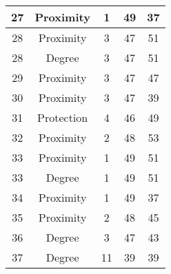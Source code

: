 \documentclass[results.tex]{subfiles}
\begin{document}
\begin{center}
\begin{tabular}{| c || c | c | c | c |}
            \hline
            27                      & Proximity                    & 1                      & 49                      & 37                   \\
            \hline
            28                      & Proximity                    & 3                      & 47                      & 51                   \\
            \hline
            28                      & Degree                       & 3                      & 47                      & 51                   \\
            \hline
            29                      & Proximity                    & 3                      & 47                      & 47                   \\
            \hline
            30                      & Proximity                    & 3                      & 47                      & 39                   \\
            \hline
            31                      & Protection                   & 4                      & 46                      & 49                   \\
            \hline
            32                      & Proximity                    & 2                      & 48                      & 53                   \\
            \hline
            33                      & Proximity                    & 1                      & 49                      & 51                   \\
            \hline
            33                      & Degree                       & 1                      & 49                      & 51                   \\
            \hline
            34                      & Proximity                    & 1                      & 49                      & 37                   \\
            \hline
            35                      & Proximity                    & 2                      & 48                      & 45                   \\
            \hline
            36                      & Degree                       & 3                      & 47                      & 43                   \\
            \hline
            37                      & Degree                       & 11                     & 39                      & 39                   \\

\end{tabular}
\end{center}
\end{document}
